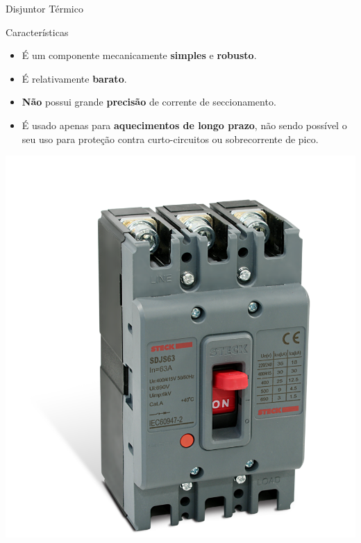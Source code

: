 \begin{frame}{Disjuntor Térmico}
	\begin{block}{Características}
		\begin{itemize}
			\item É um componente mecanicamente \textbf{simples} e \textbf{robusto}.
			\item É relativamente \textbf{barato}.
			\item \textbf{Não} possui grande \textbf{precisão} de corrente de seccionamento.
			\item É usado apenas para \textbf{aquecimentos de longo prazo}, não sendo possível o seu uso para proteção contra curto-circuitos ou sobrecorrente de pico.
		\end{itemize}
	\end{block}

	\centering
	\includegraphics[height=0.4\textheight]{Figuras/Ch04/fig7}
\end{frame}


